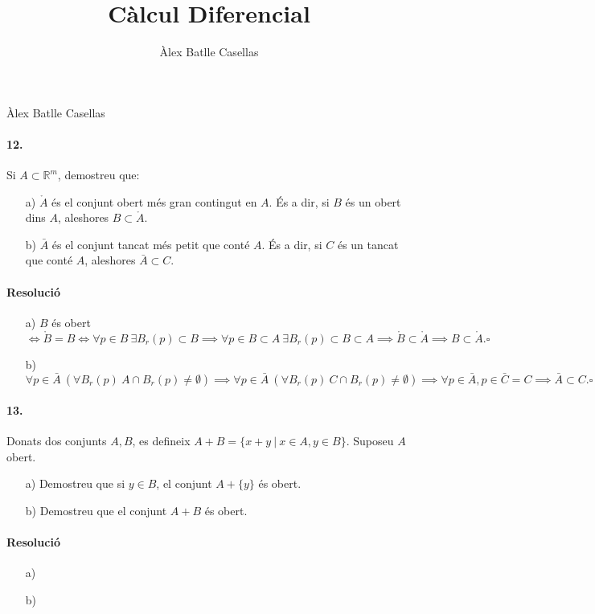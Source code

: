 \documentclass[11pt]{article}
\title{Càlcul Diferencial}
\author{Àlex Batlle Casellas}
\newcommand{\Rm}{\mathbb{R}^m}
\begin{document}
\begin{small}
Àlex Batlle Casellas
\end{small}
\paragraph{12.} Si $A\subset\Rm$, demostreu que:
\begin{itemize}
	\item[a)] $\mathring A$ és el conjunt obert més gran contingut en $A$. És a dir, si $B$ és un obert dins $A$, aleshores $B\subset\mathring A$.
	\item[b)] $\bar{A}$ és el conjunt tancat més petit que conté $A$. És a dir, si $C$ és un tancat que conté $A$, aleshores $
\bar{A}\subset C$.
\end{itemize}
\paragraph{Resolució}
\begin{itemize}
	\item[a)] $B$ és obert$\iff\mathring B=B\iff\forall p\in B\ \exists B_r(p)\subset B\implies\forall p\in B\subset A\ \exists B_r(p)\subset B\subset A\implies\mathring B\subset\mathring A\implies B\subset\mathring A.\square$
	\item[b)] $\forall p\in\bar{A}\ (\forall B_r(p)\ A\cap B_r(p)\neq\emptyset)\implies\forall p\in\bar{A}\ (\forall B_r(p)\ C\cap B_r(p)\neq\emptyset)\implies\forall p\in\bar{A},p\in\bar{C}=C\implies\bar{A}\subset C.\square$
\end{itemize}
\paragraph{13.} Donats dos conjunts $A,B$, es defineix $A+B=\{x+y\ \vert\ x\in A, y\in B\}$. Suposeu $A$ obert.
\begin{itemize}
	\item[a)] Demostreu que si $y\in B$, el conjunt $A+\{y\}$ és obert.
	\item[b)] Demostreu que el conjunt $A+B$ és obert.
\end{itemize}
\paragraph{Resolució}
\begin{itemize}
	\item[a)]
	\item[b)]
\end{itemize}
\end{document}
